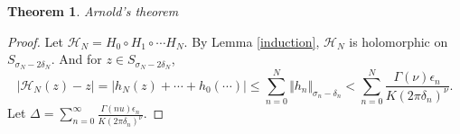 \documentclass{article}
\newtheorem{theorem}{Theorem}
\newcommand{\norm}[1]{\Vert #1 \Vert}
\begin{document}
\begin{theorem}
Arnold's theorem
\end{theorem}
\begin{proof}
Let $\mathcal{H}_N=H_0 \circ H_1 \circ \cdots H_N$. By Lemma \ref{induction}, $\mathcal{H}_N$ is
holomorphic on $S_{\sigma_N-2\delta_N}$. And for $z \in S_{\sigma_N-2\delta_N}$,
\[
|\mathcal{H}_N(z)-z| = |h_N(z)+\cdots+h_0(\cdots)| \leq \sum_{n=0}^N \norm{h_n}_{\sigma_n-\delta_n}
<\sum_{n=0}^N \frac{\Gamma(\nu)\epsilon_n}{K(2\pi\delta_n)^\nu}.
\]
Let $\Delta=\sum_{n=0}^\infty \frac{\Gamma(nu)\epsilon_n}{K(2\pi\delta_n)^\nu}$.
\end{proof}



\end{document}
